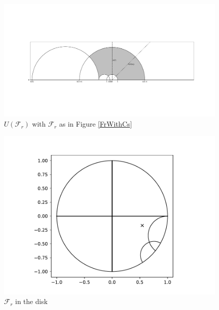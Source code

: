 \documentclass[]{article}
\begin{document}
\begin{figure}[h]
	\centering
	\includegraphics[trim=150 210 130 230, clip, width=\linewidth]{U_F_r.pdf}
	\caption{$U(\mathcal{F}_r)$ with $\mathcal{F}_r$ as in Figure \ref{FrWithCs}}
	\label{UFr}
\end{figure}

\begin{figure}[h]
	\centering
	\includegraphics[trim=65 20 70 30, clip, width=0.6\linewidth]{F_r_disk.pdf}
	\caption{$\mathcal{F}_r$ in the disk}
	\label{FrDisk}
\end{figure}

\pagebreak
\end{document}
